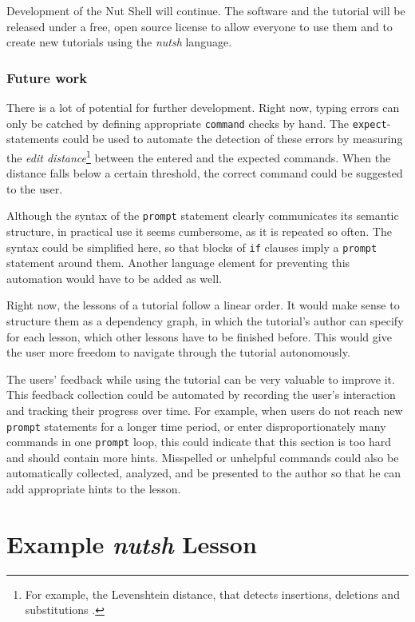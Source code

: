 \documentclass[paper=a4,twoside,abstract=on,cleardoublepage=empty,numbers=noenddot,toc=bib,12pt,appendixprefix=true]{scrreprt}
\begin{document}
Development of the Nut Shell will continue. The software and the tutorial will be released under a free, open source license to allow everyone to use them and to create new tutorials using the \emph{nutsh} language.

\subsection*{Future work}

There is a lot of potential for further development. Right now, typing errors can only be catched by defining appropriate \texttt{command} checks by hand. The \texttt{expect}-statements could be used to automate the detection of these errors by measuring the \emph{edit distance}\footnote{For example, the Levenshtein distance, that detects insertions, deletions and substitutions \cite{levenshtein66}.} between the entered and the expected commands. When the distance falls below a certain threshold, the correct command could be suggested to the user.

Although the syntax of the \texttt{prompt} statement clearly communicates its semantic structure, in practical use it seems cumbersome, as it is repeated so often. The syntax could be simplified here, so that blocks of \texttt{if} clauses imply a \texttt{prompt} statement around them. Another language element for preventing this automation would have to be added as well.

Right now, the lessons of a tutorial follow a linear order. It would make sense to structure them as a dependency graph, in which the tutorial's author can specify for each lesson, which other lessons have to be finished before. This would give the user more freedom to navigate through the tutorial autonomously.

The users' feedback while using the tutorial can be very valuable to improve it. This feedback collection could be automated by recording the user's interaction and tracking their progress over time. For example, when users do not reach new \texttt{prompt} statements for a longer time period, or enter disproportionately many commands in one \texttt{prompt} loop, this could indicate that this section is too hard and should contain more hints. Misspelled or unhelpful commands could also be automatically collected, analyzed, and be presented to the author so that he can add appropriate hints to the lesson.

\appendix

\chapter{Example \emph{nutsh} Lesson}
\label{sec:nutshexample}
\end{document}
